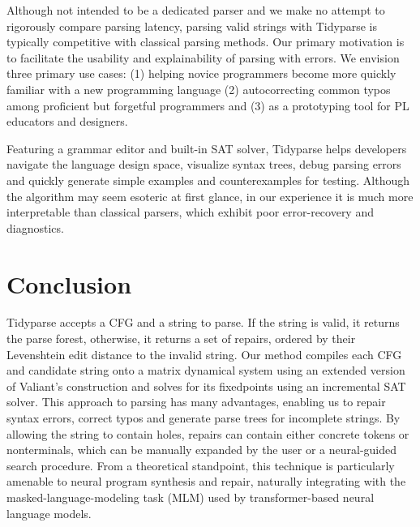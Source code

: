 \documentclass[sigplan,review,anonymous,acmsmall]{acmart}\settopmatter{printfolios=false,printccs=false,printacmref=false}
\begin{document}
    Although not intended to be a dedicated parser and we make no attempt to rigorously compare parsing latency, parsing valid strings with Tidyparse is typically competitive with classical parsing methods. Our primary motivation is to facilitate the usability and explainability of parsing with errors. We envision three primary use cases: (1) helping novice programmers become more quickly familiar with a new programming language (2) autocorrecting common typos among proficient but forgetful programmers and (3) as a prototyping tool for PL educators and designers.

    Featuring a grammar editor and built-in SAT solver, Tidyparse helps developers navigate the language design space, visualize syntax trees, debug parsing errors and quickly generate simple examples and counterexamples for testing. Although the algorithm may seem esoteric at first glance, in our experience it is much more interpretable than classical parsers, which exhibit poor error-recovery and diagnostics.

    \section{Conclusion}

    Tidyparse accepts a CFG and a string to parse. If the string is valid, it returns the parse forest, otherwise, it returns a set of repairs, ordered by their Levenshtein edit distance to the invalid string. Our method compiles each CFG and candidate string onto a matrix dynamical system using an extended version of Valiant's construction and solves for its fixedpoints using an incremental SAT solver. This approach to parsing has many advantages, enabling us to repair syntax errors, correct typos and generate parse trees for incomplete strings. By allowing the string to contain holes, repairs can contain either concrete tokens or nonterminals, which can be manually expanded by the user or a neural-guided search procedure. From a theoretical standpoint, this technique is particularly amenable to neural program synthesis and repair, naturally integrating with the masked-language-modeling task (MLM) used by transformer-based neural language models.
\end{document}
